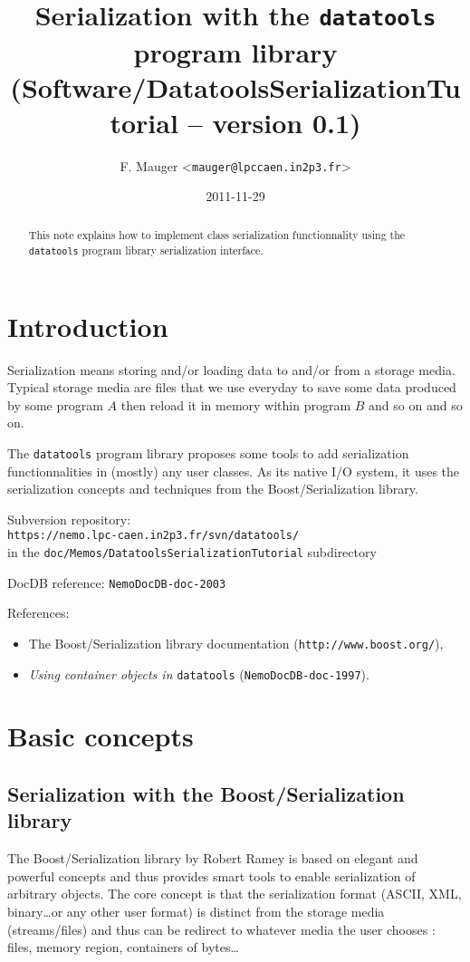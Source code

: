 \documentclass[a4paper,12pt]{article}
\title{Serialization with the \texttt{datatools} program library\\%
{\small{(Software/DatatoolsSerializationTutorial -- version 0.1)}}}
\author{F. Mauger <\texttt{mauger@lpccaen.in2p3.fr}>}
\date{2011-11-29}
\newcommand{\pn}{\par\noindent}
\begin{document}
\maketitle

\begin{abstract}
This note  explains how to implement class serialization functionnality
using the \texttt{datatools} program library serialization interface.
\end{abstract}

\section{Introduction}

\pn Serialization means  storing and/or loading data to  and/or from a
storage media. Typical storage media are files that we use everyday to
save some data  produced by some program $A$ then  reload it in memory
within program $B$ and so on and so on.

\pn The \texttt{datatools} program  library proposes some tools to add
serialization functionnalities  in (mostly)  any user classes.  As its
native I/O  system, it uses the serialization  concepts and techniques
from the Boost/Serialization library.


\vskip 5mm
\pn
Subversion repository:\\
\texttt{https://nemo.lpc-caen.in2p3.fr/svn/datatools/} \\
in the \texttt{doc/Memos/DatatoolsSerializationTutorial} subdirectory
\pn
DocDB reference: \texttt{NemoDocDB-doc-2003}
\pn
References: 
\begin{itemize}
\item The Boost/Serialization library documentation (\texttt{http://www.boost.org/}),
\item \textit{Using container objects in} \texttt{datatools}
(\texttt{NemoDocDB-doc-1997}).
\end{itemize}
\clearpage

\section{Basic concepts}

\subsection{Serialization with the Boost/Serialization  library}

The Boost/Serialization  library by Robert  Ramey is based  on elegant
and  powerful  concepts  and  thus  provides  smart  tools  to  enable
serialization  of arbitrary  objects.  The  core concept  is  that the
serialization  format  (ASCII,  XML,  binary\dots or  any  other  user
format) is  distinct from the  storage media (streams/files)  and thus
can be  redirect to  whatever media the  user chooses :  files, memory
region, containers of bytes\dots
\end{document}
